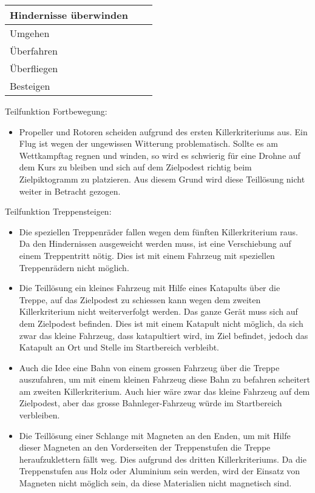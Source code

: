 \begin{longtable}[h]{l p{7cm} l}
\textbf{Hindernisse überwinden} 
\tabularnewline
\endhead
Umgehen
\tabularnewline
\cellcolor{red}Überfahren
\tabularnewline
\cellcolor{red}Überfliegen
\tabularnewline
\cellcolor{red}Besteigen
\end{longtable}

Teilfunktion Fortbewegung:
\begin{itemize}
    \item Propeller und Rotoren scheiden aufgrund des ersten Killerkriteriums aus. Ein Flug ist wegen der ungewissen Witterung problematisch. Sollte es am Wettkampftag regnen und winden, so wird es schwierig für eine Drohne auf dem Kurs zu bleiben und sich auf dem Zielpodest richtig beim Zielpiktogramm zu platzieren. Aus diesem Grund wird diese Teillösung nicht weiter in Betracht gezogen.
 \end{itemize}

Teilfunktion Treppensteigen:
\begin{itemize}
    \item Die speziellen Treppenräder fallen wegen dem fünften Killerkriterium raus. Da den Hindernissen ausgeweicht werden muss, ist eine Verschiebung auf einem Treppentritt nötig. Dies ist mit einem Fahrzeug mit speziellen Treppenrädern nicht möglich.
    \item Die Teillösung ein kleines Fahrzeug mit Hilfe eines Katapults über die Treppe, auf das Zielpodest zu schiessen kann wegen dem zweiten Killerkriterium nicht weiterverfolgt werden. Das ganze Gerät muss sich auf dem Zielpodest befinden. Dies ist mit einem Katapult nicht möglich, da sich zwar das kleine Fahrzeug, dass katapultiert wird, im Ziel befindet, jedoch das Katapult an Ort und Stelle im Startbereich verbleibt.
    \item Auch die Idee eine Bahn von einem grossen Fahrzeug über die Treppe auszufahren, um mit einem kleinen Fahrzeug diese Bahn zu befahren scheitert am zweiten Killerkriterium. Auch hier wäre zwar das kleine Fahrzeug auf dem Zielpodest, aber das grosse Bahnleger-Fahrzeug würde im Startbereich verbleiben.
    \item Die Teillösung einer Schlange mit Magneten an den Enden, um mit Hilfe dieser Magneten an den Vorderseiten der Treppenstufen die Treppe heraufzuklettern fällt weg. Dies aufgrund des dritten Killerkriteriums. Da die Treppenstufen aus Holz oder Aluminium sein werden, wird der Einsatz von Magneten nicht möglich sein, da diese Materialien nicht magnetisch sind.
\end{itemize}

